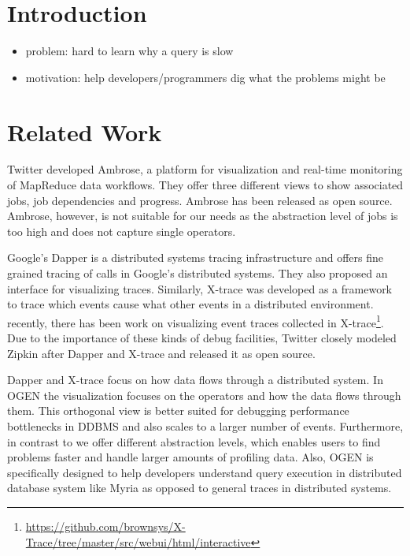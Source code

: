 \documentclass{chi2009}
\newcommand*{\system}{OGEN\xspace}
\begin{document}
\section{Introduction}



\begin{itemize}
    \item problem: hard to learn why a query is slow
    \item motivation: help developers/programmers dig what the problems might be
\end{itemize}


\section{Related Work}

Twitter developed Ambrose\cite{ambrose}, a platform for visualization and real-time monitoring of MapReduce data workflows. They offer three different views to show associated jobs, job dependencies and progress. Ambrose has been released as open source. Ambrose, however, is not suitable for our needs as the abstraction level of jobs is too high and does not capture single operators.

Google's Dapper\cite{sigelman2010dapper} is a distributed systems tracing infrastructure and offers fine grained tracing of calls in Google's distributed systems. They also proposed an interface for visualizing traces. Similarly, X-trace\cite{fonseca2007x} was developed as a framework to trace which events cause what other events in a distributed environment. recently, there has been work on visualizing event traces collected in X-trace\footnote{\url{https://github.com/brownsys/X-Trace/tree/master/src/webui/html/interactive}}. Due to the importance of these kinds of debug facilities, Twitter closely modeled Zipkin\cite{zipkin} after Dapper and X-trace and released it as open source.

Dapper and X-trace focus on how data flows through a distributed system. In \system the visualization focuses on the operators and how the data flows through them. This orthogonal view is better suited for debugging performance bottlenecks in DDBMS and also scales to a larger number of events. Furthermore, in contrast to  we offer different abstraction levels, which enables users to find problems faster and handle larger amounts of profiling data. Also, \system is specifically designed to help developers understand query execution in distributed database system like Myria as opposed to general traces in distributed systems.
\end{document}
